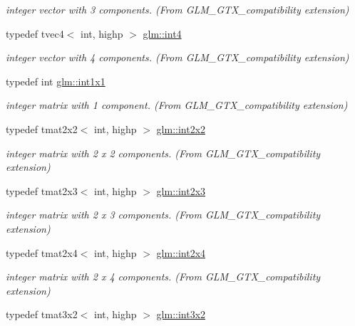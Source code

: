 \begin{DoxyCompactItemize}
\begin{DoxyCompactList}\small\item\em integer vector with 3 components. (From G\+L\+M\+\_\+\+G\+T\+X\+\_\+compatibility extension) \end{DoxyCompactList}\item 
typedef tvec4$<$ int, highp $>$ \hyperlink{group__gtx__compatibility_gab93125af983ab22b9647b64770b26aa1}{glm\+::int4}
\begin{DoxyCompactList}\small\item\em integer vector with 4 components. (From G\+L\+M\+\_\+\+G\+T\+X\+\_\+compatibility extension) \end{DoxyCompactList}\item 
typedef int \hyperlink{group__gtx__compatibility_ga09016a637a3cd093c22e6188080ac750}{glm\+::int1x1}
\begin{DoxyCompactList}\small\item\em integer matrix with 1 component. (From G\+L\+M\+\_\+\+G\+T\+X\+\_\+compatibility extension) \end{DoxyCompactList}\item 
typedef tmat2x2$<$ int, highp $>$ \hyperlink{group__gtx__compatibility_ga5f407f808d8fa5b771ea7417cedc4868}{glm\+::int2x2}
\begin{DoxyCompactList}\small\item\em integer matrix with 2 x 2 components. (From G\+L\+M\+\_\+\+G\+T\+X\+\_\+compatibility extension) \end{DoxyCompactList}\item 
typedef tmat2x3$<$ int, highp $>$ \hyperlink{group__gtx__compatibility_ga37b2b18255fa5ff7fa23d8b1d34b8034}{glm\+::int2x3}
\begin{DoxyCompactList}\small\item\em integer matrix with 2 x 3 components. (From G\+L\+M\+\_\+\+G\+T\+X\+\_\+compatibility extension) \end{DoxyCompactList}\item 
typedef tmat2x4$<$ int, highp $>$ \hyperlink{group__gtx__compatibility_gaa402ce479f756c0805d25fede99251e3}{glm\+::int2x4}
\begin{DoxyCompactList}\small\item\em integer matrix with 2 x 4 components. (From G\+L\+M\+\_\+\+G\+T\+X\+\_\+compatibility extension) \end{DoxyCompactList}\item 
typedef tmat3x2$<$ int, highp $>$ \hyperlink{group__gtx__compatibility_gac99c78a227d95384611146a64c4d3ce8}{glm\+::int3x2}

\end{DoxyCompactItemize}
